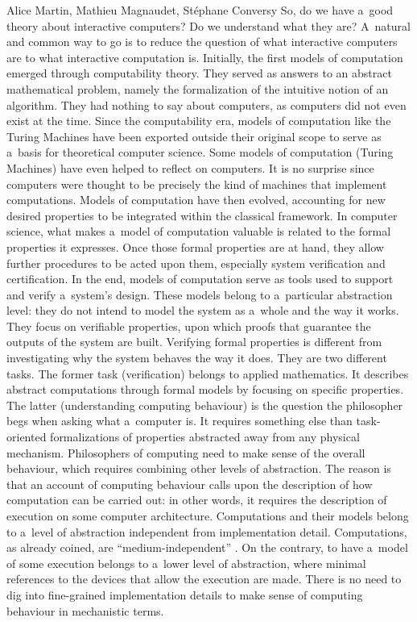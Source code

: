 \begin{artengenv2auth}{Alice Martin, Mathieu Magnaudet, Stéphane Conversy}
So, do we have a~good theory about interactive computers? Do we understand what they are? A~natural and common way to go is to reduce the question of what interactive computers are to what interactive computation is. Initially, the first models of computation emerged through computability theory. They served as answers to an abstract mathematical problem, namely the formalization of the intuitive notion of an algorithm. They had nothing to say about computers, as computers did not even exist at the time. Since the computability era, models of computation like the Turing Machines have been exported outside their original scope to serve as a~basis for theoretical computer science. Some models of computation (Turing Machines) have even helped to reflect on computers. It is no surprise since computers were thought to be precisely the kind of machines that implement computations. Models of computation have then evolved, accounting for new desired properties to be integrated within the classical framework. In computer science, what makes a~model of computation valuable is related to the formal properties it expresses. Once those formal properties are at hand, they allow further procedures to be acted upon them, especially system verification and certification.  In the end, models of computation serve as tools used to support and verify a~system’s design. These models belong to a~particular abstraction level: they do not intend to model the system as a~whole and the way it works. They focus on verifiable properties, upon which proofs that guarantee the outputs of the system are built. Verifying formal properties is different from investigating why the system behaves the way it does. They are two different tasks. The former task (verification) belongs to applied mathematics. It describes abstract computations through formal models by focusing on specific properties. The latter (understanding computing behaviour) is the question the philosopher begs when asking what a~computer is. It requires something else than task-oriented formalizations of properties abstracted away from any physical mechanism. Philosophers of computing need to make sense of the overall behaviour, which requires combining other levels of abstraction.  The reason is that an account of computing behaviour calls upon the description of how computation can be carried out: in other words, it requires the description of execution on some computer architecture.
Computations and their models belong to a~level of abstraction independent from implementation detail. Computations, as already coined, are ``medium-independent'' \parencite{Klein2020}. On the contrary, to have a~model of some execution belongs to a~lower level of abstraction, where minimal references to the devices that allow the execution are made. There is no need to dig into fine-grained implementation details to make sense of computing behaviour in mechanistic terms.


\end{artengenv2auth}
